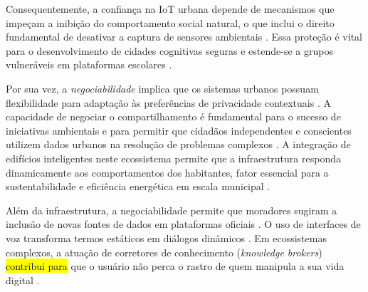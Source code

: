 \documentclass[
	12pt,				%
	oneside,			%
	a4paper,			%
	english,			%
	brazil				%
	]{abntex2ppgsi}
\begin{document}
    Consequentemente, a confiança na IoT urbana depende de mecanismos que impeçam a inibição do comportamento social natural, o que inclui o direito fundamental de desativar a captura de sensores ambientais \cite{DOWTHWAITE2024, Brombacher20221863, Bowyer2022, Crabtree2021, Zou2020769, Crabtree2016}. Essa proteção é vital para o desenvolvimento de cidades cognitivas seguras e estende-se a grupos vulneráveis em plataformas escolares \cite{Meechan2023, Royle2023, Payne2023, Strey2019Human}.

    Por sua vez, a \emph{negociabilidade} implica que os sistemas urbanos possuam flexibilidade para adaptação às preferências de privacidade contextuais \cite{DOWTHWAITE2024, Nelson2023}. A capacidade de negociar o compartilhamento é fundamental para o sucesso de iniciativas ambientais e para permitir que cidadãos independentes e conscientes utilizem dados urbanos na resolução de problemas complexos \cite{Belizario2023Interacao}. A integração de edifícios inteligentes neste ecossistema permite que a infraestrutura responda dinamicamente aos comportamentos dos habitantes, fator essencial para a sustentabilidade e eficiência energética em escala municipal \cite{bavaresco2019technological}. 

    Além da infraestrutura, a negociabilidade permite que moradores sugiram a inclusão de novas fontes de dados em plataformas oficiais \cite{Elhamdadi2022, Xiao2021, Koesten2021, Hornung2015}. O uso de interfaces de voz transforma termos estáticos em diálogos dinâmicos \cite{Sailaja2024334, Chowdhury2016}. Em ecossistemas complexos, a atuação de corretores de conhecimento (\textit{knowledge brokers}) \hl{contribui para} que o usuário não perca o rastro de quem manipula a sua vida digital \cite{Seidelin2018}.
\end{document}
